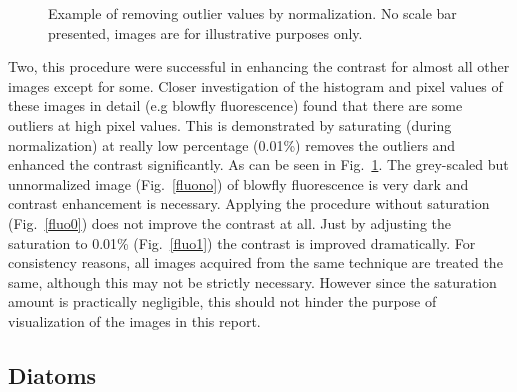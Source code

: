 \begin{figure}[h!]
\caption{Example of removing outlier values by normalization. 
No scale bar presented, images are for illustrative purposes only.}
\label{fig:normprocedure}
\end{figure}

Two, this procedure were successful in enhancing the contrast for almost all other images except for some. 
Closer investigation of the histogram and pixel values of these images in detail (e.g blowfly fluorescence) found that there are some outliers at high pixel values. 
This is demonstrated by saturating (during normalization) at really low percentage (0.01\%) removes the outliers and enhanced the contrast significantly. 
As can be seen in Fig.~\ref{fig:normprocedure}. 
The grey-scaled but unnormalized image (Fig.~\ref{fluono}) of blowfly fluorescence is very dark and contrast enhancement is necessary. 
Applying the procedure without saturation (Fig.~\ref{fluo0}) does not improve the contrast at all. 
Just by adjusting the saturation to 0.01\% (Fig.~\ref{fluo1}) the contrast is improved dramatically. 
For consistency reasons, all images acquired from the same technique are treated the same, although this may not be strictly necessary. 
However since the saturation amount is practically negligible, this should not hinder the purpose of visualization of the images in this report. 

\subsection{Diatoms}

